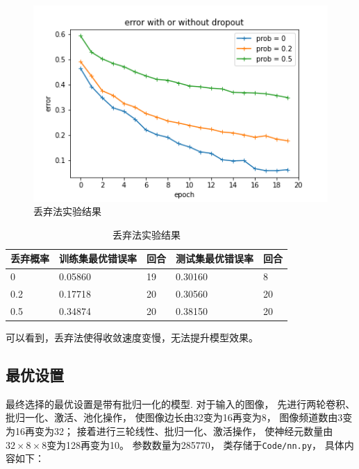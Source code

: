 \documentclass{article}
\begin{document}
\begin{figure}[p]
\includegraphics[width=\textwidth]
{Result/NN dropout 0.5/figure.png}
\caption{丢弃法实验结果}
\label{fig:dropout}
\end{figure}

\begin{table}[h]
\centering
\begin{tabular}{|l|l|l|l|l|} 
\hline
丢弃概率 & 训练集最优错误率 & 回合 & 测试集最优错误率 & 回合 \\
\hline
0 & 0.05860 & 19 & 0.30160 & 8 \\
0.2 & 0.17718 & 20 & 0.30560 & 20 \\
0.5 & 0.34874 & 20 & 0.38150 & 20 \\
\hline
\end{tabular}
\caption{丢弃法实验结果}
\label{table:dropout}
\end{table}

可以看到，丢弃法使得收敛速度变慢，无法提升模型效果。

\subsection{最优设置}

最终选择的最优设置是带有批归一化的模型.
对于输入的图像，
先进行两轮卷积、批归一化、激活、池化操作，
使图像边长由32变为16再变为8，
图像频道数由3变为16再变为32；
接着进行三轮线性、批归一化、激活操作，
使神经元数量由$32\times8\times8$变为128再变为10。
参数数量为285770，
类存储于\verb|Code/nn.py|，
具体内容如下：
\end{document}
